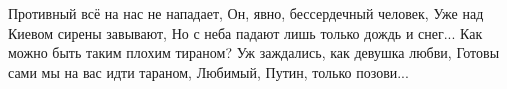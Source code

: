  
 
 
 
 

Противный всё на нас не нападает,
Он, явно, бессердечный человек,
Уже над Киевом сирены завывают,
Но с неба падают лишь только дождь и снег...
Как можно быть таким плохим тираном?
Уж заждались, как девушка любви,
Готовы сами мы на вас идти тараном,
Любимый, Путин, только позови...
